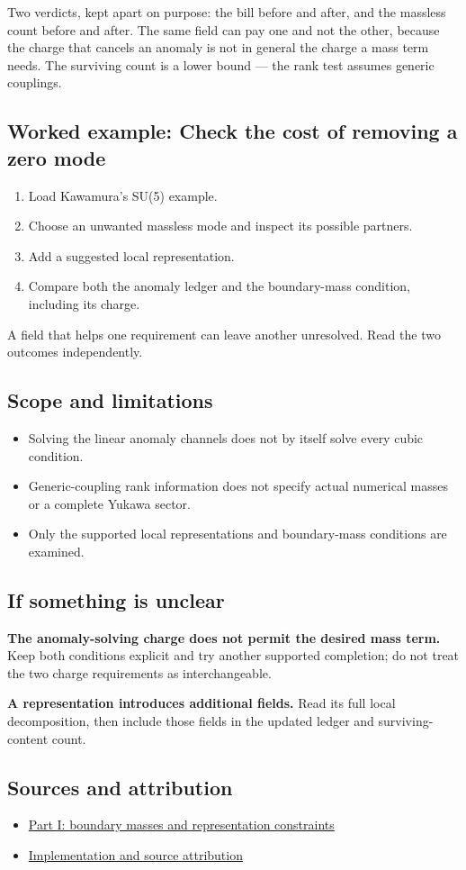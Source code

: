 \documentclass[11pt,a4paper]{article}
\begin{document}
Two verdicts, kept apart on purpose: the bill before and after, and the massless count before and after. The same field can pay one and not the other, because the charge that cancels an anomaly is not in general the charge a mass term needs. The surviving count is a lower bound --- the rank test assumes generic couplings.
\subsection*{Worked example: Check the cost of removing a zero mode}
\begin{enumerate}
\item Load Kawamura's SU(5) example.
\item Choose an unwanted massless mode and inspect its possible partners.
\item Add a suggested local representation.
\item Compare both the anomaly ledger and the boundary-mass condition, including its charge.
\end{enumerate}
A field that helps one requirement can leave another unresolved. Read the two outcomes independently.
\subsection*{Scope and limitations}
\begin{itemize}
\item Solving the linear anomaly channels does not by itself solve every cubic condition.
\item Generic-coupling rank information does not specify actual numerical masses or a complete Yukawa sector.
\item Only the supported local representations and boundary-mass conditions are examined.
\end{itemize}
\subsection*{If something is unclear}
\textbf{The anomaly-solving charge does not permit the desired mass term.} Keep both conditions explicit and try another supported completion; do not treat the two charge requirements as interchangeable.

\textbf{A representation introduces additional fields.} Read its full local decomposition, then include those fields in the updated ledger and surviving-content count.

\subsection*{Sources and attribution}
\begin{itemize}
\item \href{https://karlesmarin.github.io/ghu-explorer/papers/part-i/index.html}{Part I: boundary masses and representation constraints}
\item \href{https://github.com/karlesmarin/ghu-lab/blob/main/src/sections/brane_section.js}{Implementation and source attribution}
\end{itemize}
\end{document}
